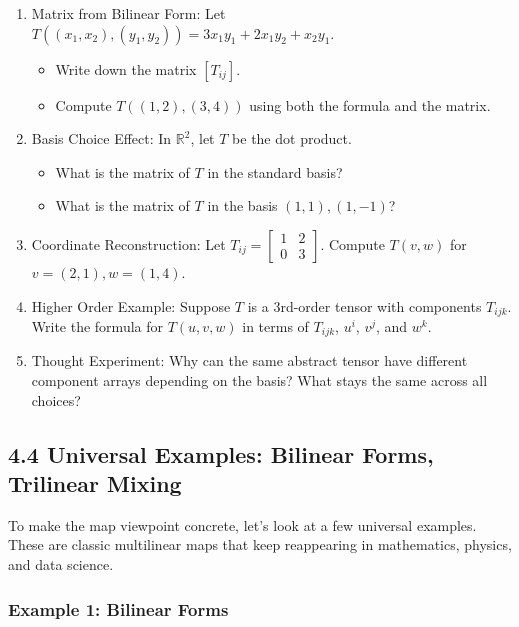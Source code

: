 \documentclass[
  letterpaper,
  DIV=11,
  numbers=noendperiod]{scrreprt}
\providecommand{\tightlist}{%
  \setlength{\itemsep}{0pt}\setlength{\parskip}{0pt}}
\begin{document}
\begin{enumerate}
\def\labelenumi{\arabic{enumi}.}
\item
  Matrix from Bilinear Form: Let
  \(T((x_1,x_2),(y_1,y_2)) = 3x_1y_1 + 2x_1y_2 + x_2y_1\).

  \begin{itemize}
  \tightlist
  \item
    Write down the matrix \([T_{ij}]\).
  \item
    Compute \(T((1,2),(3,4))\) using both the formula and the matrix.
  \end{itemize}
\item
  Basis Choice Effect: In \(\mathbb{R}^2\), let \(T\) be the dot
  product.

  \begin{itemize}
  \tightlist
  \item
    What is the matrix of \(T\) in the standard basis?
  \item
    What is the matrix of \(T\) in the basis \((1,1),(1,-1)\)?
  \end{itemize}
\item
  Coordinate Reconstruction: Let
  \(T_{ij} = \begin{bmatrix}1 & 2 \\ 0 & 3\end{bmatrix}\). Compute
  \(T(v,w)\) for \(v=(2,1), w=(1,4)\).
\item
  Higher Order Example: Suppose \(T\) is a 3rd-order tensor with
  components \(T_{ijk}\). Write the formula for \(T(u,v,w)\) in terms of
  \(T_{ijk}\), \(u^i\), \(v^j\), and \(w^k\).
\item
  Thought Experiment: Why can the same abstract tensor have different
  component arrays depending on the basis? What stays the same across
  all choices?
\end{enumerate}

\subsection{4.4 Universal Examples: Bilinear Forms, Trilinear
Mixing}\label{universal-examples-bilinear-forms-trilinear-mixing}

To make the map viewpoint concrete, let's look at a few universal
examples. These are classic multilinear maps that keep reappearing in
mathematics, physics, and data science.

\subsubsection{Example 1: Bilinear
Forms}\label{example-1-bilinear-forms}
\end{document}
